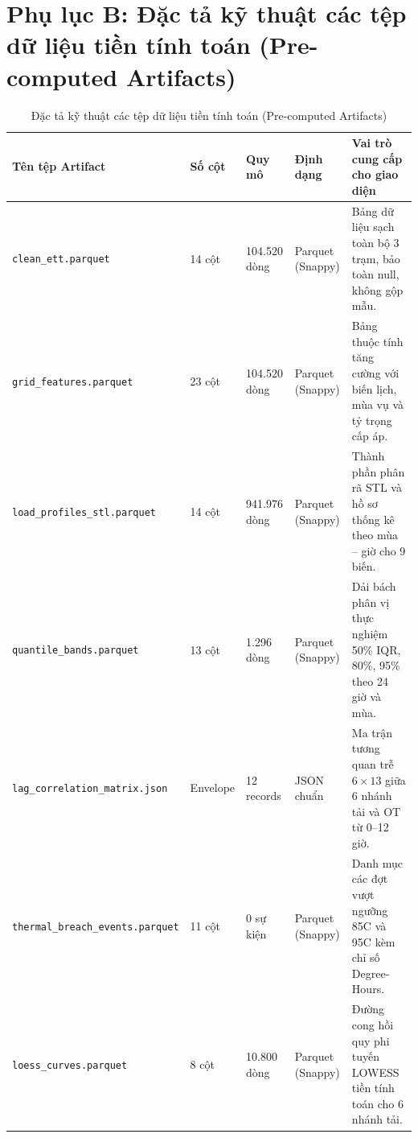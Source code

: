 \documentclass[12pt,a4paper,oneside]{report}
\newcommand{\thead}{\rowcolor{gray!20}}
\newcommand{\tablesetup}{\small\setstretch{1.05}%
  \renewcommand{\arraystretch}{1.3}\rowcolors{2}{white}{gray!6}}
\newcommand{\dC}{\textdegree C\xspace}
\newcommand{\code}[1]{\texttt{#1}}
\begin{document}
\section*{Phụ lục B: Đặc tả kỹ thuật các tệp dữ liệu tiền tính toán (Pre-computed Artifacts)}

\begin{table}[H]
\centering
\caption{Đặc tả kỹ thuật các tệp dữ liệu tiền tính toán (Pre-computed Artifacts)}
\label{tab:artifacts_appendix}
\tablesetup
\begin{tabularx}{\textwidth}{|Q{4.0cm}|C{1.8cm}|C{2.4cm}|C{2.4cm}|L|}
\hline
\thead \textbf{Tên tệp Artifact} & \textbf{Số cột} & \textbf{Quy mô} & \textbf{Định dạng} & \textbf{Vai trò cung cấp cho giao diện}\\ \hline
\code{clean\_ett.parquet} & 14 cột & 104.520 dòng & Parquet (Snappy) & Bảng dữ liệu sạch toàn bộ 3 trạm, bảo toàn null, không gộp mẫu.\\ \hline
\code{grid\_features.parquet} & 23 cột & 104.520 dòng & Parquet (Snappy) & Bảng thuộc tính tăng cường với biến lịch, mùa vụ và tỷ trọng cấp áp.\\ \hline
\code{load\_profiles\_stl.parquet} & 14 cột & 941.976 dòng & Parquet (Snappy) & Thành phần phân rã STL và hồ sơ thống kê theo mùa -- giờ cho 9 biến.\\ \hline
\code{quantile\_bands.parquet} & 13 cột & 1.296 dòng & Parquet (Snappy) & Dải bách phân vị thực nghiệm 50\% IQR, 80\%, 95\% theo 24 giờ và mùa.\\ \hline
\code{lag\_correlation\_matrix.json} & Envelope & 12 records & JSON chuẩn & Ma trận tương quan trễ $6\times 13$ giữa 6 nhánh tải và OT từ 0--12 giờ.\\ \hline
\code{thermal\_breach\_events.parquet} & 11 cột & 0 sự kiện & Parquet (Snappy) & Danh mục các đợt vượt ngưỡng 85\dC và 95\dC kèm chỉ số Degree-Hours.\\ \hline
\code{loess\_curves.parquet} & 8 cột & 10.800 dòng & Parquet (Snappy) & Đường cong hồi quy phi tuyến LOWESS tiền tính toán cho 6 nhánh tải.\\ \hline
\end{tabularx}
\end{table}
\end{document}
